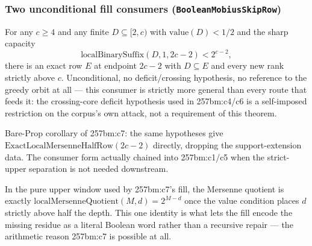 \subsubsection*{Two unconditional fill consumers (\texttt{BooleanMobiusSkipRow})}

\begin{thm}
For any $c\ge4$ and any finite $D\subseteq[2,c)$ with $\mathrm{value}(D)<1/2$ and the sharp
capacity
\[
\mathrm{localBinarySuffix}(D,1,2c-2) < 2^{c-2},
\]
there is an exact row $E$ at endpoint $2c-2$ with $D\subseteq E$ and every new rank strictly
above $c$. Unconditional, no deficit/crossing hypothesis, no reference to the greedy orbit at
all — this consumer is strictly more general than every route that feeds it: the crossing-core
deficit hypothesis used in 257bm:c4/c6 is a self-imposed restriction on the corpus's own
attack, not a requirement of this theorem.
\par\noindent{}   
\end{thm}

\begin{thm}
Bare-Prop corollary of 257bm:c7: the same hypotheses give $\mathrm{ExactLocalMersenneHalfRow}(2c-2)$
directly, dropping the support-extension data. The consumer form actually chained into
257bm:c1/c5 when the strict-upper separation is not needed downstream.
\par\noindent{}   
\end{thm}

\begin{prop}
In the pure upper window used by 257bm:c7's fill, the Mersenne quotient is exactly
$\mathrm{localMersenneQuotient}(M,d) = 2^{M-d}$ once the value condition places $d$ strictly
above half the depth. This one identity is what lets the fill encode the missing residue as a
literal Boolean word rather than a recursive repair — the arithmetic reason 257bm:c7 is
possible at all.
\par\noindent{}   
\end{prop}

